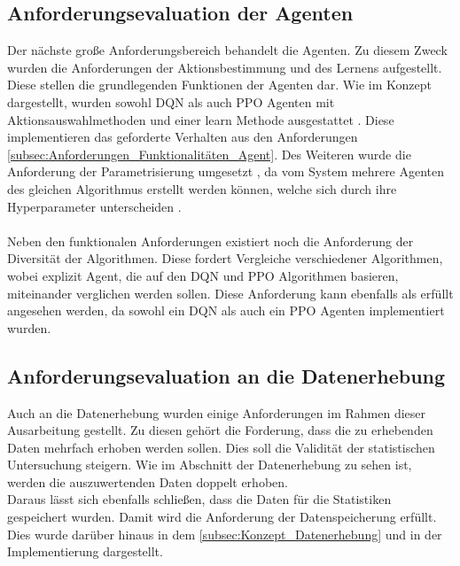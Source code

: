 \subsection{Anforderungsevaluation der Agenten}
Der nächste große Anforderungsbereich behandelt die Agenten. Zu diesem Zweck wurden die Anforderungen der Aktionsbestimmung und des Lernens aufgestellt. Diese stellen die grundlegenden Funktionen der Agenten dar. 
Wie im Konzept dargestellt, wurden sowohl DQN als auch PPO Agenten mit Aktionsauswahlmethoden und einer learn Methode ausgestattet . Diese implementieren das geforderte Verhalten aus den Anforderungen \ref{subsec:Anforderungen_Funktionalitäten_Agent}. Des Weiteren wurde die Anforderung der Parametrisierung umgesetzt , da vom System mehrere Agenten des gleichen Algorithmus erstellt werden können, welche sich durch ihre Hyperparameter unterscheiden .\\
\\Neben den funktionalen Anforderungen existiert noch die Anforderung der Diversität der Algorithmen.
Diese fordert Vergleiche verschiedener Algorithmen, wobei explizit Agent, die auf den DQN und PPO Algorithmen basieren, miteinander verglichen werden sollen. Diese Anforderung kann ebenfalls als erfüllt angesehen werden, da sowohl ein DQN  als auch ein PPO Agenten  implementiert wurden.

\subsection{Anforderungsevaluation an die Datenerhebung} \label{sec:Evaluation_Datenerhebung}
Auch an die Datenerhebung wurden einige Anforderungen im Rahmen dieser Ausarbeitung gestellt. Zu diesen gehört die Forderung, dass die zu erhebenden Daten mehrfach erhoben werden sollen. Dies soll die Validität der statistischen Untersuchung steigern. Wie im Abschnitt der Datenerhebung  zu sehen ist, werden die auszuwertenden Daten doppelt erhoben.\\
Daraus lässt sich ebenfalls schließen, dass die Daten für die Statistiken gespeichert wurden. Damit wird die Anforderung der Datenspeicherung erfüllt. Dies wurde darüber hinaus in dem \autoref{subsec:Konzept_Datenerhebung} und in der Implementierung  dargestellt.

